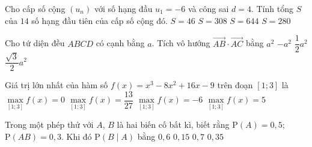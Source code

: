 \begin{ex}%
	Cho cấp số cộng $(u_n)$ với số hạng đầu $u_1=-6$ và công sai $d=4$. Tính tổng $S$ của $14$ số hạng đầu tiên của cấp số cộng đó.
	\choice
	{$S=46$}
	{$S=308$}
	{$S=644$}
	{\True $S=280$}
\end{ex}

\begin{ex}%
	Cho tứ diện đều $ABCD$ có cạnh bằng $a$. Tích vô hướng $\overrightarrow{AB}\cdot\overrightarrow{AC}$ bằng
	\choice
	{$a^2$}
	{$-a^2$}
	{\True $\dfrac{1}{2}{a^2}$}
	{$\dfrac{\sqrt{3}}{2}{a^2}$}
\end{ex}

\begin{ex}%
	Giá trị lớn nhất của hàm số $f(x)=x^3-8x^2+16x-9$ trên đoạn $[1;3]$ là 
	\choice
	{$\max\limits_{[1;3]}f(x)=0$}
	{\True $\max\limits_{[1;3]}f(x)=\dfrac{13}{27}$}
	{$\max\limits_{[1;3]}f(x)=-6$}
	{$\max\limits_{[1;3]}f(x)=5$}
\end{ex}

\begin{ex}%
	Trong một phép thử với $A$, $B$ là hai biến cố bất kì, biết rằng $\mathrm{P}(A)=0{,}5$; $\mathrm{P}(AB)=0{,}3$. Khi đó $\mathrm{P}\left(B\mid A\right)$ bằng
	\choice
	{\True $0{,}6$}
	{$0{,}15$}
	{$0{,}7$}
	{$0{,}35$}
\end{ex}

